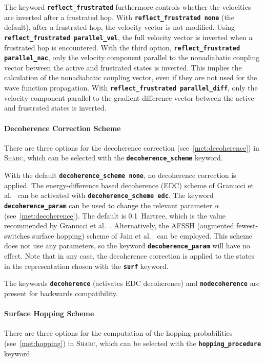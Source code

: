 \documentclass[a4paper,10pt,DIV=15,openany]{scrbook}
\newcommand{\sharc}{\textsc{Sharc}}
\newcommand{\ttt}[1]{\textbf{\texttt{#1}}}
\begin{document}
The keyword \ttt{reflect\_frustrated} furthermore controls whether the velocities are inverted after a frustrated hop.
With \ttt{reflect\_frustrated none} (the default), after a frustrated hop, the velocity vector is not modified.
Using \ttt{reflect\_frustrated parallel\_vel}, the full velocity vector is inverted when a frustrated hop is encountered.
With the third option, \ttt{reflect\_frustrated parallel\_nac}, only the velocity component parallel to the nonadiabatic coupling vector between the active and frustrated states is inverted. This implies the calculation of the nonadiabatic coupling vector, even if they are not used for the wave function propagation.
With \ttt{reflect\_frustrated parallel\_diff}, only the velocity component parallel to the gradient difference vector between the active and frustrated states is inverted.

\paragraph{Decoherence Correction Scheme}

There are three options for the decoherence correction (see~\ref{met:decoherence}) in \sharc, which can be selected with the \ttt{decoherence\_scheme} keyword. 

With the default \ttt{decoherence\_scheme none}, no decoherence correction is applied.
The energy-difference based decoherence (EDC) scheme of Granucci et al.~\cite{Granucci2010JCP} can be activated with \ttt{decoherence\_scheme edc}. 
The keyword \ttt{decoherence\_param} can be used to change the relevant parameter $\alpha$ (see~\ref{met:decoherence}). The default is 0.1~Hartree, which is the value recommended by Granucci et al.~\cite{Granucci2010JCP}.
Alternatively, the AFSSH (augmented fewest-switches surface hopping) scheme of Jain et al.~\cite{Jain2016JCTC} can be employed. This scheme does not use any parameters, so the keyword \ttt{decoherence\_param} will have no effect.
Note that in any case, the decoherence correction is applied to the states in the representation chosen with the \ttt{surf} keyword.

The keywords \ttt{decoherence} (activates EDC decoherence) and \ttt{nodecoherence} are present for backwards compatibility.

\paragraph{Surface Hopping Scheme}

There are three options for the computation of the hopping probabilities (see~\ref{met:hopping}) in \sharc, which can be selected with the \ttt{hopping\_procedure} keyword. 
\end{document}
